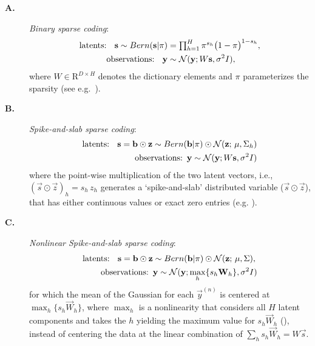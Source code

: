 \begin{description}
\item[\textbf{A.}] \textit{Binary sparse coding}:
%
\vspace{-.1cm}
\begin{align}
\text{latents: } \,\,\,\vec{s} \sim Bern(\vec{s} | \pi) &= \disT\prod_{h=1}^H \pi^{s_h} \big( 1 - \pi \big)^{1-s_h},\nonumber \\
\text{observations:  }\,\,\,    \vec{y} &\sim \mathcal{N}(\vec{y}; W\vec{s}, \sigma^2\One),\nonumber%
\end{align}
%
where $W \in \mathrm{R}^{D \times H}$ denotes the dictionary elements and $\pi$ parameterizes the sparsity (see e.g.~\citep{HennigesEtAl2010}).
%
\item[\textbf{B.}] \textit{Spike-and-slab sparse coding}:
\vspace{-.2cm}
\begin{align}
\text{latents: } \,\,\,\vec{s} = \vec{b}\odot\vec{z} \sim Bern(\vec{b} | \pi) \odot \mathcal{N}(\vec{z};\,\vec{\mu} , \Sigma_h)\nonumber\\
\text{observations:}  \,\,\, \vec{y} \sim \mathcal{N}(\vec{y}; W\vec{s}, \sigma^2\One)\nonumber%
\end{align}
where the point-wise multiplication of the two latent vectors, i.e., $(\vec{s}\odot\vec{z})_h = s_h\,z_h$
generates a `spike-and-slab' distributed variable ($\vec{s}\odot\vec{z}$), that has either continuous values or exact zero entries (e.g. \citep{TitsiasGredilla2011,GoodfellowEtAl2013,SheikhEtAl2014}).
%
\item[\textbf{C.}] \textit{Nonlinear Spike-and-slab sparse coding}:
\vspace{-.2cm}
\begin{align}\label{eq:ssmca}
\text{latents: } \,\,\,{\mathbf{s}} = {\mathbf{b}}\odot{\mathbf{z}} &\sim Bern({\mathbf{b}} | \pi) \odot \mathcal{N}({\mathbf{z}};\,{\mathbf{\mu}} , \Sigma), \nonumber\\
 \text{observations:}\,\,\, &{\mathbf{y}} \sim \mathcal{N}({\mathbf{y}}; \max_{h}\{s_h{\mathbf{W}}_{h}\}, \sigma^2I)\nonumber
\end{align}
for which the mean of the Gaussian for each $\vec{y}^{(n)}$ is centered at $\max_{h}\{s_h\vec{W}_{h}\}$, where $\max_{h}$ is a nonlinearity that considers all $H$ latent components and takes the $h$ yielding the maximum value for $s_h\vec{W}_{h}$ (\citep{LuckeSahani2008,SheltonEtAl2012,BornscheinEtAl2013}), instead of centering the data at the linear combination of $\sum_h s_h\vec{W}_h=W\vec{s}$.
%
\end{description}

